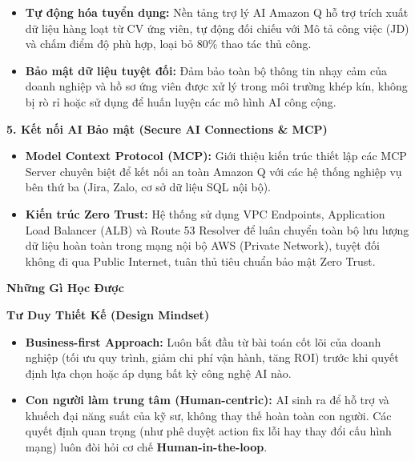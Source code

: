 \begin{itemize}
\tightlist
\item
  \textbf{Tự động hóa tuyển dụng:} Nền tảng trợ lý AI Amazon Q hỗ trợ
  trích xuất dữ liệu hàng loạt từ CV ứng viên, tự động đối chiếu với Mô
  tả công việc (JD) và chấm điểm độ phù hợp, loại bỏ 80\% thao tác thủ
  công.
\item
  \textbf{Bảo mật dữ liệu tuyệt đối:} Đảm bảo toàn bộ thông tin nhạy cảm
  của doanh nghiệp và hồ sơ ứng viên được xử lý trong môi trường khép
  kín, không bị rò rỉ hoặc sử dụng để huấn luyện các mô hình AI công
  cộng.
\end{itemize}

\vspace{0.5em}\noindent\textbf{5. Kết nối AI Bảo mật (Secure AI Connections \& MCP)}

\begin{itemize}
\tightlist
\item
  \textbf{Model Context Protocol (MCP):} Giới thiệu kiến trúc thiết lập
  các MCP Server chuyên biệt để kết nối an toàn Amazon Q với các hệ
  thống nghiệp vụ bên thứ ba (Jira, Zalo, cơ sở dữ liệu SQL nội bộ).
\item
  \textbf{Kiến trúc Zero Trust:} Hệ thống sử dụng VPC Endpoints,
  Application Load Balancer (ALB) và Route 53 Resolver để luân chuyển
  toàn bộ lưu lượng dữ liệu hoàn toàn trong mạng nội bộ AWS (Private
  Network), tuyệt đối không đi qua Public Internet, tuân thủ tiêu chuẩn
  bảo mật Zero Trust.
\end{itemize}

\vspace{0.5em}\noindent\textbf{Những Gì Học Được}

\vspace{0.5em}\noindent\textbf{Tư Duy Thiết Kế (Design Mindset)}

\begin{itemize}
\tightlist
\item
  \textbf{Business-first Approach:} Luôn bắt đầu từ bài toán cốt lõi của
  doanh nghiệp (tối ưu quy trình, giảm chi phí vận hành, tăng ROI) trước
  khi quyết định lựa chọn hoặc áp dụng bất kỳ công nghệ AI nào.
\item
  \textbf{Con người làm trung tâm (Human-centric):} AI sinh ra để hỗ trợ
  và khuếch đại năng suất của kỹ sư, không thay thế hoàn toàn con người.
  Các quyết định quan trọng (như phê duyệt action fix lỗi hay thay đổi
  cấu hình mạng) luôn đòi hỏi cơ chế \textbf{Human-in-the-loop}.
\end{itemize}


